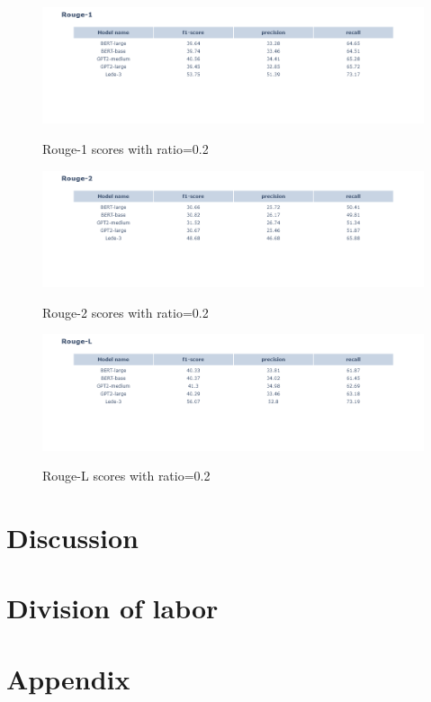 \documentclass{article}
\begin{document}
\begin{figure}
	\centering
	\hspace*{-3cm}
	\includegraphics[scale=0.55]{rouge1.png}\\
	\caption{Rouge-1 scores with ratio=0.2}
	\label{fig:rouge1_02}
\end{figure}



\begin{figure}
	\centering
	\hspace*{-3cm}
	\includegraphics[scale=0.55]{rouge2.png}\\
	\caption{Rouge-2 scores with ratio=0.2}
	\label{fig:rouge2_02}
\end{figure}

\begin{figure}
	\centering
	\hspace*{-3cm}
	\includegraphics[scale=0.55]{rougel.png}\\
	\caption{Rouge-L scores with ratio=0.2}
	\label{fig:rougel_02}
\end{figure}
\section{Discussion}


\section{Division of labor}


\section{Appendix}


\end{document}
